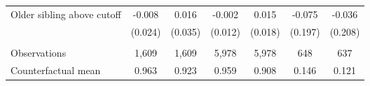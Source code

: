 {{\begin{tabular}{lcccccc}
Older sibling above cutoff&      -0.008   &       0.016   &      -0.002   &       0.015   &      -0.075   &      -0.036   \\
                    &     (0.024)   &     (0.035)   &     (0.012)   &     (0.018)   &     (0.197)   &     (0.208)   \\
                    &               &               &               &               &               &               \\
Observations        &       1,609   &       1,609   &       5,978   &       5,978   &         648   &         637   \\
Counterfactual mean &       0.963   &       0.923   &       0.959   &       0.908   &       0.146   &       0.121   \\
 

\bottomrule
\end{tabular}
}
}
